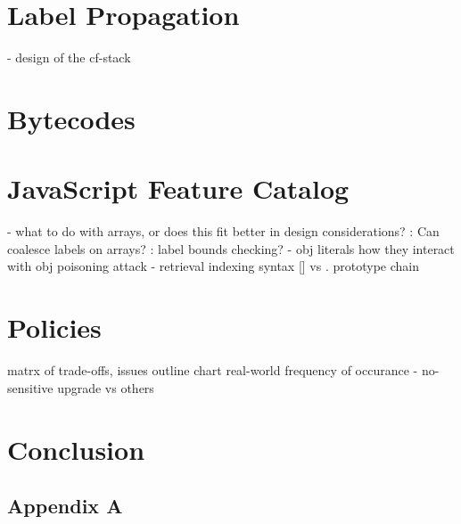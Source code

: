 \documentclass[12pt,fleqn]{ucithesis}
\begin{document}
\chapter{Label Propagation}
 - design of the cf-stack
\chapter{Bytecodes}
\chapter{JavaScript Feature Catalog}
 - what to do with arrays, or does this fit better in design considerations?
   : Can coalesce labels on arrays?
   : label bounds checking? 
 - obj literals
   how they interact with obj poisoning attack
 - retrieval
   indexing syntax [] vs .
   prototype chain
\chapter{Policies}
  matrx of trade-offs, issues
  outline chart
  real-world frequency of occurance
  - no-sensitive upgrade vs others
\chapter{Conclusion}

\clearpage
{}




\appendix
\section{Appendix A}
\end{document}
